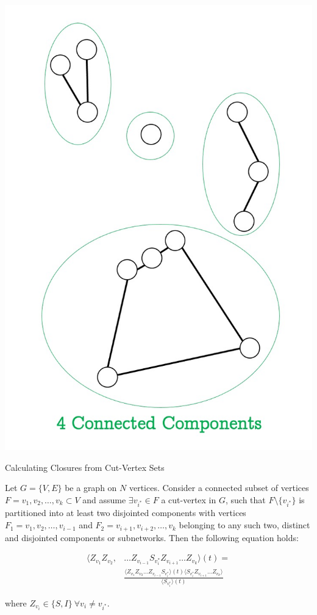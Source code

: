 \documentclass[unknownkeysallowed]{beamer}
\begin{document}
\begin{frame}
\centering\includegraphics[height=0.9\textheight]{assets/eg-cutvertex/3}
\end{frame}


\begin{frame}{Calculating Closures from Cut-Vertex Sets}

Let $G = \{V,E\}$ be a graph on $N$ vertices. \pause Consider a connected subset of vertices $F = {v_1,v_2,\dots,v_k}\subset V$ \pause and assume $\exists v_{i^\ast} \in F$ a cut-vertex in $G$, such that $F \setminus \{v_{i^\ast}\}$ is partitioned into at least two disjointed components with vertices $F_1 = {v_1, v_2,\dots, v_{i-1}}$ and $F_2 = {v_{i+1}, v_{i+2},\dots, v_k}$ belonging to any such two, distinct and disjointed components or subnetworks. \pause Then the following equation holds:

\begin{align*}
\langle Z_{v_1} Z_{v_2},& \dots Z_{v_{i-1}} S_{v_i^\ast} Z_{v_{i+1}} \dots Z_{v_k} \rangle (t) = \\
&\frac{\langle Z_{v_1} Z_{v_2} \dots Z_{v_{i-1}} S_{v_i^\ast}\rangle(t)\langle S_{v_i^\ast} Z_{v_{i+1}} \dots Z_{v_k} \rangle}{\langle S_{v_i^\ast} \rangle (t)}
\end{align*}

where $Z_{v_i} \in \{S, I\}~\forall v_i \neq v_{i^\ast}$. \cite{kiss_2014}

\end{frame}
\end{document}
